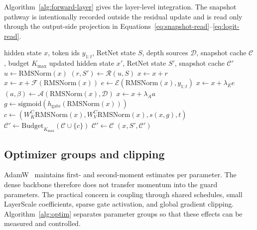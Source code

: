 \documentclass[preprint,12pt]{elsarticle}
\newcommand{\Ret}{\mathcal{R}}
\newcommand{\Eng}{\mathcal{E}}
\newcommand{\Att}{\mathcal{A}}
\newcommand{\FFN}{\mathcal{F}}
\newcommand{\Cache}{\mathcal{C}}
\newcommand{\RMS}{\mathrm{RMSNorm}}
\newcommand{\sigmoid}{\mathrm{sigmoid}}
\begin{document}
Algorithm~\ref{alg:forward-layer} gives the layer-level integration. The snapshot pathway is intentionally recorded outside the residual update and is read only through the output-side projection in Equations~\eqref{eq:snapshot-read}--\eqref{eq:logit-read}.

\begin{algorithm}[H]
\caption{Forward pass of a budgeted hybrid layer}
\label{alg:forward-layer}
\begin{algorithmic}[1]
\Require hidden state $x$, token ids $y_{1:t}$, RetNet state $S$, depth sources $\mathcal{D}$, snapshot cache $\Cache$, budget $K_{\max}$
\Ensure updated hidden state $x'$, RetNet state $S'$, snapshot cache $\Cache'$
\State $u \gets \RMS(x)$
\State $(r,S') \gets \Ret(u,S)$ 
\State $x \gets x+r$
\State $x \gets x+\FFN(\RMS(x))$ 
    \State $e \gets \Eng(\RMS(x),y_{1:t})$
    \State $x \gets x+\lambda_E e$ 
\EndIf
{}
    \State $(a,\beta) \gets \Att(\RMS(x),\mathcal{D})$
    \State $x \gets x+\lambda_A a$ 
\EndIf
\State $g \gets \sigmoid(h_{\mathrm{gate}}(\RMS(x)))$
    \State $c \gets (W_K^C\RMS(x), W_V^C\RMS(x), s(x,g), t)$
    \State $\Cache' \gets \mathrm{Budget}_{K_{\max}}(\Cache\cup\{c\})$
\Else
    \State $\Cache' \gets \Cache$
\EndIf
\State \Return $(x,S',\Cache')$
\end{algorithmic}
\end{algorithm}

\subsection{Optimizer groups and clipping}

AdamW~\cite{adamw} maintains first- and second-moment estimates per parameter. The dense backbone therefore does not transfer momentum into the guard parameters. The practical concern is coupling through shared schedules, small LayerScale coefficients, sparse gate activation, and global gradient clipping. Algorithm~\ref{alg:optim} separates parameter groups so that these effects can be measured and controlled.
\end{document}

